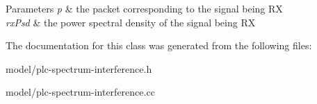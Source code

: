 \begin{DoxyParams}{\-Parameters}
{\em p} & the packet corresponding to the signal being \-R\-X \\
\hline
{\em rx\-Psd} & the power spectral density of the signal being \-R\-X \\
\hline
\end{DoxyParams}


\-The documentation for this class was generated from the following files\-:\begin{DoxyCompactItemize}
\item 
model/plc-\/spectrum-\/interference.\-h\item 
model/plc-\/spectrum-\/interference.\-cc\end{DoxyCompactItemize}
